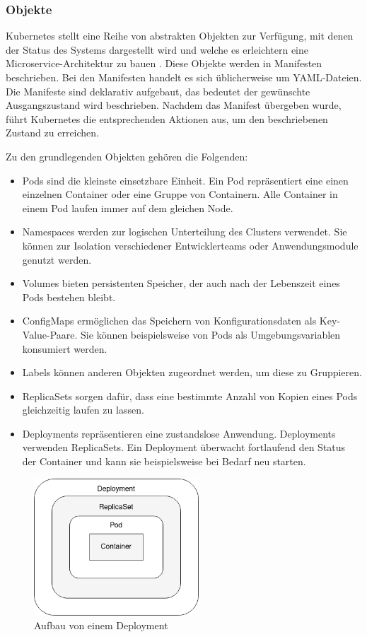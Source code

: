 \subsubsection{Objekte}

Kubernetes stellt eine Reihe von abstrakten Objekten zur Verfügung, mit denen der Status des Systems dargestellt wird und welche es erleichtern eine Microservice-Architektur zu bauen \parencite[vgl.][S. 13]{hightowerKubernetes2018}. Diese Objekte werden in Manifesten beschrieben. Bei den Manifesten handelt es sich üblicherweise um YAML-Dateien. Die Manifeste sind deklarativ aufgebaut, das bedeutet der gewünschte Ausgangszustand wird beschrieben. Nachdem das Manifest übergeben wurde, führt Kubernetes die entsprechenden Aktionen aus, um den beschriebenen Zustand zu erreichen.

Zu den grundlegenden Objekten gehören die Folgenden:
\begin{itemize}
\item Pods sind die kleinste einsetzbare Einheit. Ein Pod repräsentiert eine einen einzelnen Container oder eine Gruppe von Containern. Alle Container in einem Pod laufen immer auf dem gleichen Node.
\item Namespaces werden zur logischen Unterteilung des Clusters verwendet. Sie können zur Isolation verschiedener Entwicklerteams oder Anwendungsmodule genutzt werden.
\item Volumes bieten persistenten Speicher, der auch nach der Lebenszeit eines Pods bestehen bleibt.
\item ConfigMaps ermöglichen das Speichern von Konfigurationsdaten als Key-Value-Paare. Sie können beispielsweise von Pods als Umgebungsvariablen konsumiert werden.
\item Labels können anderen Objekten zugeordnet werden, um diese zu Gruppieren.
\item ReplicaSets sorgen dafür, dass eine bestimmte Anzahl von Kopien eines Pods gleichzeitig laufen zu lassen.
\item Deployments repräsentieren eine zustandslose Anwendung. Deployments verwenden ReplicaSets. Ein Deployment überwacht fortlaufend den Status der Container und kann sie beispielsweise bei Bedarf neu starten.
\end{itemize}

\begin{figure}[H] 
    \centering
    \includegraphics[width=0.55\textwidth]{figures/KubernetesDeployment.png}
    \caption{Aufbau von einem Deployment}
\end{figure}

